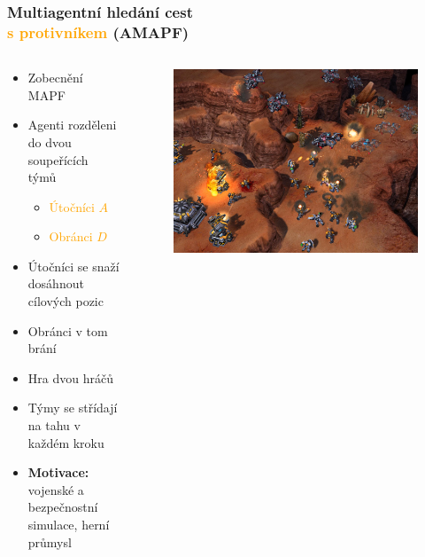\documentclass[aspectratio=169,t,xcolor=table]{beamer}
\begin{document}
\begin{frame}
\frametitle{Multiagentní hledání cest  \\\textcolor{orange}{s protivníkem} (AMAPF)}
\begin{columns}
\begin{column}{.65\textwidth}
\begin{itemize}
    \item Zobecnění MAPF
    \item Agenti rozděleni do dvou soupeřících týmů
    \begin{itemize}
        \item<2-> \textcolor{orange}{Útočníci $A$} 
        \item<2-> \textcolor{orange}{Obránci $D$} 
    \end{itemize}
        \item<3-> Útočníci se snaží dosáhnout cílových pozic
        \item<3-> Obránci v tom brání
    \item<4-> Hra dvou hráčů
    \item<4-> Týmy se střídají na tahu v každém kroku
    \item<5-> \textbf{Motivace: } vojenské a bezpečnostní simulace, herní průmysl
\end{itemize}
\end{column}
\begin{column}{.35\textwidth}
        \begin{figure}
        \hspace{-60pt}
        \vspace{-40pt}
        \includegraphics[width=.8\textwidth]{figs/game.jpg}
    \end{figure}
\end{column}
\end{columns}
\end{frame}
\end{document}
